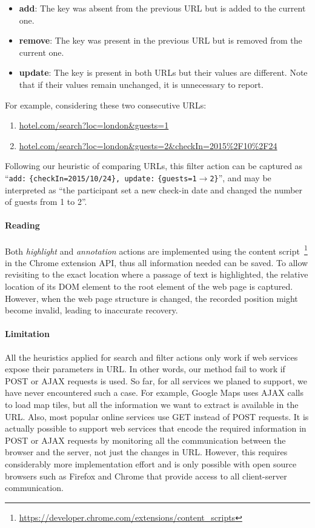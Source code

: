 \begin{itemize}
	\item \textbf{add}: The key was absent from the previous URL but is added to the current one.
	\item \textbf{remove}: The key was present in the previous URL but is removed from the current one.
	\item \textbf{update}: The key is present in both URLs but their values are different. Note that if their values remain unchanged, it is unnecessary to report.
\end{itemize}

For example, considering these two consecutive URLs:
\begin{enumerate}
	\item \url{hotel.com/search?loc=london&guests=1}
	\item \url{hotel.com/search?loc=london&guests=2&checkIn=2015%2F10%2F24}
\end{enumerate}

Following our heuristic of comparing URLs, this filter action can be captured as ``\texttt{add:} \texttt{\{checkIn=2015/10/24\}, update:} \texttt{\{guests=1$\rightarrow$2\}}'', and may be interpreted as ``the participant set a new check-in date and changed the number of guests from 1 to 2''.

\paragraph{Reading} Both \emph{highlight} and \emph{annotation} actions are implemented using the content script~\footnote{\url{https://developer.chrome.com/extensions/content_scripts}} in the Chrome extension API, thus all information needed can be saved. To allow revisiting to the exact location where a passage of text is highlighted, the relative location of its DOM element to the root element of the web page is captured. However, when the web page structure is changed, the recorded position might become invalid, leading to inaccurate recovery.

\paragraph{Limitation} All the heuristics applied for search and filter actions only work if web services expose their parameters in URL. In other words, our method fail to work if POST or AJAX requests is used. So far, for all services we planed to support, we have never encountered such a case. For example, Google Maps uses AJAX calls to load map tiles, but all the information we want to extract is available in the URL. Also, most popular online services use GET instead of POST requests. It is actually possible to support web services that encode the required information in POST or AJAX requests by monitoring all the communication between the browser and the server, not just the changes in URL. However, this requires considerably more implementation effort and is only possible with open source browsers such as Firefox and Chrome that provide access to all client-server communication.

